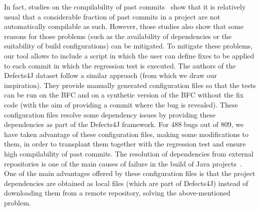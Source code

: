 In fact, studies on the compilability of past commits~\cite{tufano2017there,maes2022revisiting} show that it is relatively usual that a considerable fraction of past commits in a project are not automatically compilable as such. However, those studies also show that some reasons for those problems (such as the availability of dependencies or the suitability of build configurations) can be mitigated. 
To mitigate these problems, our tool allows to include a script in which the user can define fixes to be applied to each commit in which the regression test is executed. 
The authors of the Defects4J dataset follow a similar approach (from which we draw our inspiration). 
They provide manually generated configuration files so that the tests can be run on the BFC and on a synthetic version of the BFC without the fix code (with the aim of providing a commit where the bug is revealed).
These configuration files resolve some dependency issues by providing these dependencies as part of the Defects4J framework.
For 488 bugs out of 809, we have taken advantage of these configuration files, making some modifications to them, in order to transplant them together with the regression test and ensure high compilability of past commits.
The resolution of dependencies from external repositories is one of the main causes of failure in the build of Java projects~\cite{tufano2017there,maes2022revisiting}.
One of the main advantages offered by these configuration files is that the project dependencies are obtained as local files (which are part of Defects4J) instead of downloading them from a remote repository, solving the above-mentioned problem.

